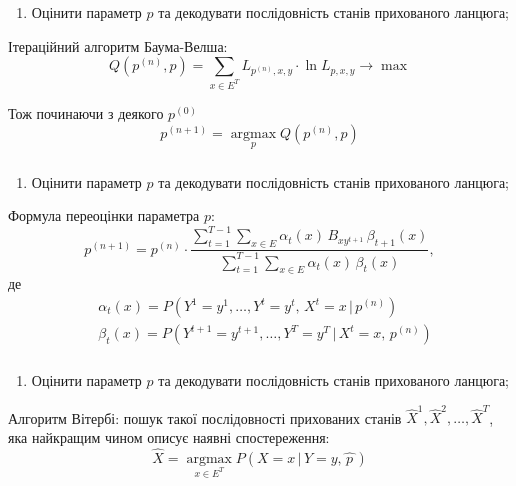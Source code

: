 \documentclass[12pt,mathserif]{beamer}
\DeclareMathOperator*{\argmax}{argmax}
\theoremstyle{plain}
\begin{document}
\begin{frame}[t]
    \frametitle{\insertsection}
    \begin{enumerate}[1]
        \item Оцінити параметр $p$ та декодувати послідовність станів прихованого ланцюга;
    \end{enumerate}
    \vspace{1cm}

    Ітераційний алгоритм Баума-Велша: 
    \begin{equation*}
        Q\left( p^{(n)},p \right) = \sum_{x \in E^T}L_{p^{(n)},x,y}\cdot\ln L_{p,x,y} \longrightarrow \max
    \end{equation*}

    \pause
    Тож починаючи з деякого $p^{(0)}$
    \begin{equation*}
        p^{(n+1)} = \argmax\limits_{p} Q\left( p^{(n)},p \right)
    \end{equation*}
\end{frame}

\begin{frame}[t]
    \frametitle{\insertsection}
    \begin{enumerate}[1]
        \item Оцінити параметр $p$ та декодувати послідовність станів прихованого ланцюга;
    \end{enumerate}
    \vspace{1cm}

    Формула переоцінки параметра $p:$
    \begin{equation*}
        p^{(n+1)} = p^{(n)}\cdot\frac{\sum\limits_{t=1}^{T-1}\sum\limits_{x \in E} \alpha_t(x)\,B_{xy^{t+1}}\,\beta_{t+1}(x)}{\sum\limits_{t=1}^{T-1}\sum\limits_{x \in E} \alpha_t(x)\,\beta_t(x)},
    \end{equation*}
    де 
    \begin{align*}
        & \alpha_t(x) = P\left( Y^1=y^1,\ldots,Y^t=y^t,\,X^t=x \,|\, p^{(n)} \right) \\
        & \beta_t(x) = P\left( Y^{t+1}=y^{t+1},\ldots,Y^T=y^T \,|\, X^t=x,\, p^{(n)} \right)
    \end{align*}
\end{frame}

\begin{frame}[t]
    \frametitle{\insertsection}
    \begin{enumerate}[1]
        \item Оцінити параметр $p$ та декодувати послідовність станів прихованого ланцюга;
    \end{enumerate}
    \vspace{1cm}

    Алгоритм Вітербі: пошук такої послідовності прихованих станів $\widehat{X}^1,\widehat{X}^2,\ldots,\widehat{X}^T$, яка найкращим чином описує наявні спостереження:
    \begin{equation*}
        \widehat{X} = \argmax\limits_{x \in E^T} P\left( X=x\,|\,Y=y,\widehat{\,p\,} \right)
    \end{equation*}
\end{frame}
\end{document}
